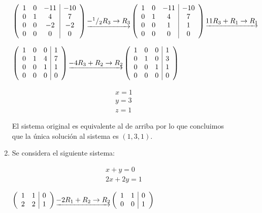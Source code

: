 \documentclass[12pt]{article}
\begin{document}
\begin{description}
\begin{enumerate}
\begin{math}
\left(
\begin{array}{c c c|c}
1 & 0 & -11 & -10 \\
0 & 1 & 4   & 7   \\
0 & 0 & -2  & -2  \\
0 & 0 & 0   & 0
\end{array}
\right)
\underrightarrow{-^1/_2 R_3 \to R_3}
\left(
\begin{array}{c c c|c}
1 & 0 & -11 & -10 \\
0 & 1 & 4   & 7   \\
0 & 0 & 1   & 1   \\
0 & 0 & 0   & 0
\end{array}
\right)
\underrightarrow{11 R_3 + R_1 \to R_1}
\end{math}

\begin{math}
\left(
\begin{array}{c c c|c}
1 & 0 & 0 & 1 \\
0 & 1 & 4 & 7 \\
0 & 0 & 1 & 1 \\
0 & 0 & 0 & 0
\end{array}
\right)
\underrightarrow{-4 R_3 + R_2 \to R_2}
\left(
\begin{array}{c c c|c}
1 & 0 & 0 & 1 \\
0 & 1 & 0 & 3 \\
0 & 0 & 1 & 1 \\
0 & 0 & 0 & 0
\end{array}
\right)
\end{math}

\begin{eqnarray}
x = 1 \nonumber \\
y = 3 \nonumber \\
z = 1 \nonumber
\end{eqnarray}

El sistema original es equivalente al de arriba por lo que concluimos que la única solución al sistema es $(1, 3, 1)$.

\item
Se considera el siguiente sistema:

\begin{eqnarray}
x + y = 0 	   \nonumber \\
2 x + 2 y = 1 \nonumber
\end{eqnarray}

\begin{math}
\left(
\begin{array}{c c|c}
1 & 1 & 0 \\
2 & 2 & 1 \\
\end{array}
\right)
\underrightarrow{-2 R_1 + R_2 \to R_2}
\left(
\begin{array}{c c|c}
1 & 1 & 0 \\
0 & 0 & 1 \\
\end{array}
\right)
\end{math}


\end{enumerate}
\end{description}
\end{document}
